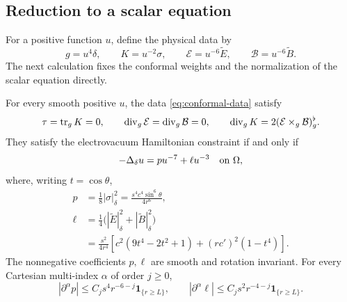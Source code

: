 \subsection{Reduction to a scalar equation}

For a positive function $u$, define the physical data by
\begin{equation}
\label{eq:conformal-data}
 g=u^4\delta,\qquad K=u^{-2}\sigma,\qquad
 \mathcal E=u^{-6}\widetilde E,\qquad
 \mathcal B=u^{-6}\widetilde B.
\end{equation}
The next calculation fixes the conformal weights and the normalization
of the scalar equation directly.

\begin{lemma}
\label{lem:conformal}
For every smooth positive $u$, the data \eqref{eq:conformal-data} satisfy
\[
 \tau=\operatorname{tr}_g K=0,\qquad
 \operatorname{div}_g\mathcal E=\operatorname{div}_g\mathcal B=0,
 \qquad
 \operatorname{div}_gK=2(\mathcal E\times_g\mathcal B)^\flat_g.
\]
They satisfy the electrovacuum Hamiltonian constraint if and only if
\begin{equation}
\label{eq:scalar}
 -\Delta_\delta u=p u^{-7}+\ell u^{-3}\quad\hbox{on }\Omega,
\end{equation}
where, writing $t=\cos\theta$,
\begin{equation}
\label{eq:coefficients}
\begin{aligned}
 p&=\frac18|\sigma|_\delta^2
   =\frac{s^4c^4\sin^6\theta}{4r^6},\\
 \ell&=\frac14\bigl(|\widetilde E|_\delta^2
                  +|\widetilde B|_\delta^2\bigr)\\
   &=\frac{s^2}{4r^4}
      \left[c^2(9t^4-2t^2+1)+(rc')^2(1-t^4)\right].
\end{aligned}
\end{equation}
The nonnegative coefficients $p,\ell$ are smooth and rotation invariant.
For every Cartesian multi-index $\alpha$ of order $j\ge0$,
\begin{equation}
\label{eq:source-coefficient-bounds}
 |\partial^\alpha p|\le C_j s^4r^{-6-j}\mathbf1_{\{r\ge L\}},\qquad
 |\partial^\alpha\ell|\le C_j s^2r^{-4-j}\mathbf1_{\{r\ge L\}}.
\end{equation}
\end{lemma}

